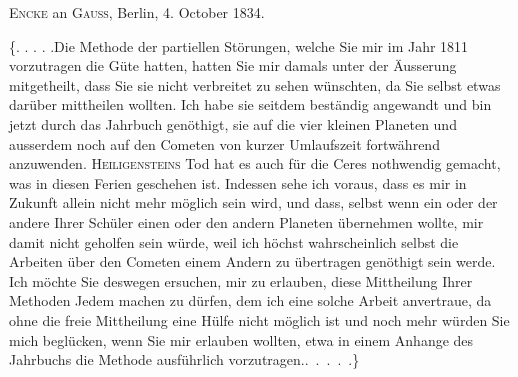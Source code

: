 \par{}\bigskip
\begin{center}
\textsc{Encke} an \textsc{Gauss}, Berlin, 4. October 1834.
\end{center}
\noindent\hspace*{\parindent}\{. . . . .\quad Die Methode der partiellen Störungen, welche Sie mir im Jahr 1811 vorzutragen die Güte hatten, hatten Sie mir damals unter der Äusserung mitgetheilt, dass Sie sie nicht verbreitet zu sehen wünschten, da Sie selbst etwas darüber mittheilen wollten. Ich habe sie seitdem beständig angewandt und bin jetzt durch das Jahrbuch genöthigt, sie auf die vier kleinen Planeten und ausserdem noch auf den Cometen von kurzer Umlaufszeit fortwährend anzuwenden. \textsc{Heiligensteins} Tod hat es auch für die Ceres nothwendig gemacht, was in diesen Ferien geschehen ist. Indessen sehe ich voraus, dass es mir in Zukunft allein nicht mehr möglich sein wird, und dass, selbst wenn ein oder der andere Ihrer Schüler einen oder den andern Planeten übernehmen wollte, mir damit nicht geholfen sein würde, weil ich höchst wahrscheinlich selbst die Arbeiten über den Cometen einem Andern zu übertragen genöthigt sein werde. Ich möchte Sie deswegen ersuchen, mir zu erlauben, diese Mittheilung Ihrer Methoden Jedem machen zu dürfen, dem ich eine solche Arbeit anvertraue, da ohne die freie Mittheilung eine Hülfe nicht möglich ist und noch mehr würden Sie mich beglücken, wenn Sie mir erlauben wollten, etwa in einem Anhange des Jahrbuchs die Methode ausführlich vorzutragen.\quad\mbox{. . . . .\}}
\par
